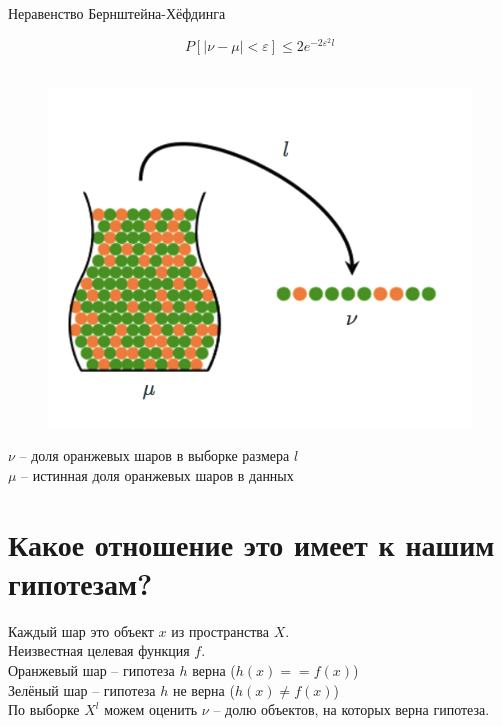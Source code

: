 \documentclass[10pt]{beamer}
\begin{document}
\begin{frame}{Неравенство Бернштейна-Хёфдинга}
  \begin{minipage}[t]{0.5\linewidth}
    $$P[\vert \nu - \mu \vert < \varepsilon ] \leq 2 e^{-2 \varepsilon^2 l} $$\\
  \end{minipage}%
  \begin{minipage}{0.45\textwidth}
    \begin{center}
      \begin{figure}
        \includegraphics[width=\textwidth, keepaspectratio]{images/bin}    
      \end{figure}
    \end{center}

  \end{minipage}%
    \bigbreak
    $\nu$ -- доля оранжевых шаров в выборке размера $l$\\
    $\mu$ -- истинная доля оранжевых шаров в данных 
  
\end{frame}

\section{Какое отношение это имеет к нашим гипотезам?}

\begin{frame}
  Каждый шар это объект $x$ из пространства $X$.\\
  Неизвестная целевая функция $f$.\\
  \bigbreak
  Оранжевый шар -- гипотеза $h$ верна ($h(x) == f(x)$)\\
  Зелёный шар -- гипотеза $h$ не верна ($h(x) \neq f(x)$)\\
  \bigbreak
  По выборке $X^l$ можем оценить $\nu$ -- долю объектов, на которых верна гипотеза.
\end{frame}
\end{document}

